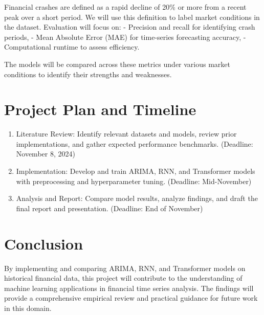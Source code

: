 \documentclass[12pt, letterpaper]{article}
\begin{document}
        Financial crashes are defined as a rapid decline of 20\% or more from a recent peak over a short period. We will use this definition to label market conditions in the dataset. Evaluation will focus on:
        - Precision and recall for identifying crash periods,
        - Mean Absolute Error (MAE) for time-series forecasting accuracy,
        - Computational runtime to assess efficiency.

        The models will be compared across these metrics under various market conditions to identify their strengths and weaknesses.
\section*{Project Plan and Timeline}
        \begin{enumerate}[label=-]
            \item Literature Review: Identify relevant datasets and models, review prior implementations, and gather expected performance benchmarks. (Deadline: November 8, 2024)
            \item Implementation: Develop and train ARIMA, RNN, and Transformer models with preprocessing and hyperparameter tuning. (Deadline: Mid-November)
            \item Analysis and Report: Compare model results, analyze findings, and draft the final report and presentation. (Deadline: End of November)
        \end{enumerate}
        
\section*{Conclusion}
    By implementing and comparing ARIMA, RNN, and Transformer models on historical financial data, this project will contribute to the understanding of machine learning applications in financial time series analysis. The findings will provide a comprehensive empirical review and practical guidance for future work in this domain.
\end{document}
